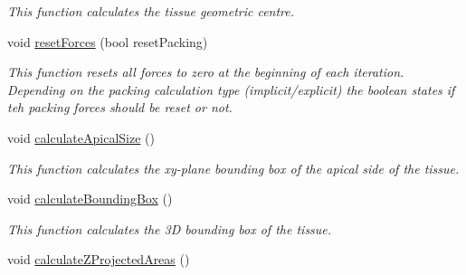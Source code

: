 \begin{DoxyCompactItemize}
\begin{DoxyCompactList}\small\item\em This function calculates the tissue geometric centre. \end{DoxyCompactList}\item 
\hypertarget{classSimulation_a5c0989e1c64b0fde348701454e9fbf67}{}void \hyperlink{classSimulation_a5c0989e1c64b0fde348701454e9fbf67}{reset\+Forces} (bool reset\+Packing)\label{classSimulation_a5c0989e1c64b0fde348701454e9fbf67}

\begin{DoxyCompactList}\small\item\em This function resets all forces to zero at the beginning of each iteration. Depending on the packing calculation type (implicit/explicit) the boolean states if teh packing forces should be reset or not. \end{DoxyCompactList}\item 
\hypertarget{classSimulation_a8e6ec9457aa61d2493747d0110a50ca5}{}void \hyperlink{classSimulation_a8e6ec9457aa61d2493747d0110a50ca5}{calculate\+Apical\+Size} ()\label{classSimulation_a8e6ec9457aa61d2493747d0110a50ca5}

\begin{DoxyCompactList}\small\item\em This function calculates the xy-\/plane bounding box of the apical side of the tissue. \end{DoxyCompactList}\item 
\hypertarget{classSimulation_a4950a649e48408ad5756acd9c2718665}{}void \hyperlink{classSimulation_a4950a649e48408ad5756acd9c2718665}{calculate\+Bounding\+Box} ()\label{classSimulation_a4950a649e48408ad5756acd9c2718665}

\begin{DoxyCompactList}\small\item\em This function calculates the 3\+D bounding box of the tissue. \end{DoxyCompactList}\item 
\hypertarget{classSimulation_af21c5c157e6f487f879bdd7043288982}{}void \hyperlink{classSimulation_af21c5c157e6f487f879bdd7043288982}{calculate\+Z\+Projected\+Areas} ()\label{classSimulation_af21c5c157e6f487f879bdd7043288982}


\end{DoxyCompactItemize}
